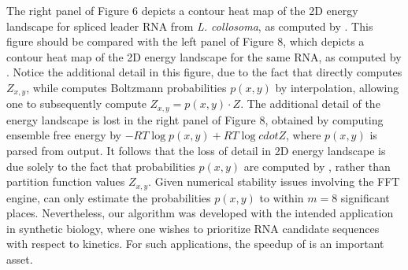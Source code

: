 The right panel of Figure 6 depicts a contour
heat map of the 2D energy landscape for spliced leader RNA from
{\em L. collosoma}, as computed by \ffttwo.
This figure should be compared with the left panel of
Figure 8, which depicts a contour heat map of the 2D energy landscape for
the same RNA, as computed by \rnatwofold.
Notice the additional detail in this figure, due
to the fact that \rnatwofold directly computes $Z_{x,y}$, while
\ffttwo computes Boltzmann probabilities $p(x,y)$ by interpolation,
allowing one to subsequently compute $Z_{x,y} = p(x,y) \cdot Z$.
The additional detail of the energy landscape is lost in the right panel of
Figure 8, obtained by computing ensemble free energy by
$-RT \log p(x,y) + RT \log cdot Z$, where $p(x,y)$ is parsed from
\rnatwofold output.  It follows that the loss of detail in
2D energy landscape is due solely to the fact that probabilities $p(x,y)$ are
computed by \ffttwo, rather than partition function values
$Z_{x,y}$. Given numerical stability issues involving the FFT engine,
\ffttwo can only estimate the probabilities $p(x,y)$ to within
$m=8$ significant places. Nevertheless, our algorithm \ffttwo
was developed with the intended application in synthetic biology, where
one wishes to prioritize RNA candidate sequences with respect to kinetics.
For such applications, the speedup of \ffttwo is an important asset.
